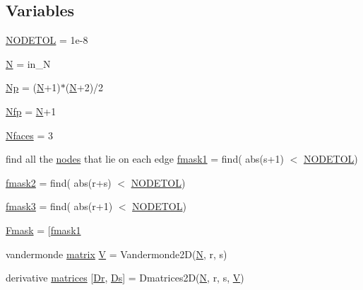\subsection*{Variables}
\begin{DoxyCompactItemize}
\item 
\hyperlink{a00575_a409781c62c346e9048df00ae7d289582}{N\+O\+D\+E\+T\+OL} = 1e-\/8
\item 
\hyperlink{a00575_a8cc2e7240164328fdc3f0e5e21032c56}{N} = in\+\_\+N
\item 
\hyperlink{a00575_abe50207e56666a60c81e2a58f522eea3}{Np} = (\hyperlink{a00473_a5b9c4563028063ee53b517cce9aa701b}{N}+1)$\ast$(\hyperlink{a00473_a5b9c4563028063ee53b517cce9aa701b}{N}+2)/2
\item 
\hyperlink{a00575_a20f422f104b7455cf2904b755786b44f}{Nfp} = \hyperlink{a00473_a5b9c4563028063ee53b517cce9aa701b}{N}+1
\item 
\hyperlink{a00575_aac4846947deeade1c4227c400ab38c13}{Nfaces} = 3
\item 
find all the \hyperlink{a00608_a9fd973fb7dcbed4123ae5eb2f3868e61}{nodes} that lie on each edge \hyperlink{a00575_a94fc3ab9217cab318ada4ca502b10620}{fmask1} = find( abs(s+1) $<$ \hyperlink{a00575_a409781c62c346e9048df00ae7d289582}{N\+O\+D\+E\+T\+OL})\textquotesingle{}
\item 
\hyperlink{a00575_a2db7941f6935f48a7799d8214a5da8e7}{fmask2} = find( abs(r+s) $<$ \hyperlink{a00575_a409781c62c346e9048df00ae7d289582}{N\+O\+D\+E\+T\+OL})\textquotesingle{}
\item 
\hyperlink{a00575_afa6c03554970806d170ae51e45e92765}{fmask3} = find( abs(r+1) $<$ \hyperlink{a00575_a409781c62c346e9048df00ae7d289582}{N\+O\+D\+E\+T\+OL})\textquotesingle{}
\item 
\hyperlink{a00575_a9d248ff3c701af57ed3e241d735bd034}{Fmask} = \mbox{[}\hyperlink{a00575_a94fc3ab9217cab318ada4ca502b10620}{fmask1}
\item 
vandermonde \hyperlink{a01014_af07ff1035f34d77764ff516f110e6832}{matrix} \hyperlink{a00575_af658e24e5ad7935911c432c5c02d895c}{V} = Vandermonde2D(\hyperlink{a00473_a5b9c4563028063ee53b517cce9aa701b}{N}, r, s)
\item 
derivative \hyperlink{a00575_aa1d11ae751a4c689ad724854c407be92}{matrices} \mbox{[}\hyperlink{a00473_aa3f5ebfc6bdc8e458334129d39b52461}{Dr}, \hyperlink{a00473_ad9a5661d9c2ea85b3143c8ecb7127d5d}{Ds}\mbox{]} = Dmatrices2D(\hyperlink{a00473_a5b9c4563028063ee53b517cce9aa701b}{N}, r, s, \hyperlink{a00575_af658e24e5ad7935911c432c5c02d895c}{V})
\item 

\end{DoxyCompactItemize}

